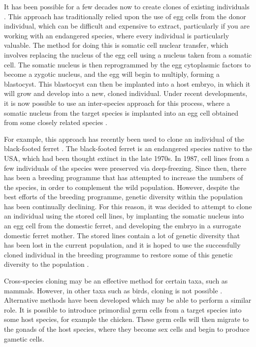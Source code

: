 \documentclass[12pt]{article}
\begin{document}
	It has been possible for a few decades now to create clones of existing individuals \citep{campbellSheepClonedNuclear1996}.
	This approach has traditionally relied upon the use of egg cells from the donor
	individual, which can be difficult and expensive to extract, particularly if you are
	working with an endangered species, where every individual is particularly valuable.
	The method for doing this is somatic cell nuclear transfer, which involves replacing
	the nucleus of the egg cell using a nucleus taken from a somatic cell. The somatic
	nucleus is then reprogrammed by the egg cytoplasmic factors to become a zygotic nucleus,
	and the egg will begin to multiply, forming a blastocyst. This blastocyst can then be
	implanted into a host embryo, in which it will grow and develop into a new, cloned
	individual. Under recent developments, it is now possible to use an inter-species
	approach for this process, where a somatic nucleus from the target species is
	implanted into an egg cell obtained from some closely related species \citep{loiGeneticRescueEndangered2001}.
	
	For example, this approach has recently been used to clone an individual of the black-footed ferret
	\citep{frittsConservationFirstCloned2022, wiselyRoadMap21st2015, sandlerEthicalAnalysisCloning2021}. The black-footed ferret is an endangered species native to the 
	USA, which had been thought extinct in the late 1970s. In 1987, cell lines from a few
	individuals of the species were preserved via deep-freezing. Since then, there has been
	a breeding programme that has attempted to increase the numbers of the species, in order
	to complement the wild population. However, despite the best efforts of the breeding
	programme, genetic diversity within the population has been continually declining. For
	this reason, it was decided to attempt to clone an individual using the stored cell
	lines, by implanting the somatic nucleus into an egg cell from the domestic ferret, 
	and developing the embryo in a surrogate domestic ferret mother. The stored lines contain
	a lot of genetic diversity that has been lost in the current population, and it is hoped
	to use the successfully cloned individual in the breeding programme to restore some of
	this genetic diversity to the population \citep{frittsConservationFirstCloned2022}.
	
	Cross-species cloning may be an effective method for certain taxa, such as mammals.
	However, in other taxa such as birds, cloning is not possible \citep{frittsConservationFirstCloned2022}. Alternative methods
	have been developed which may be able to perform a similar role. It is possible to 
	introduce primordial germ cells from a target species into some host species, for
	example the chicken. These germ cells will then migrate to the gonads of the host
	species, where they become sex cells and begin to produce gametic cells.
	
\end{document}
